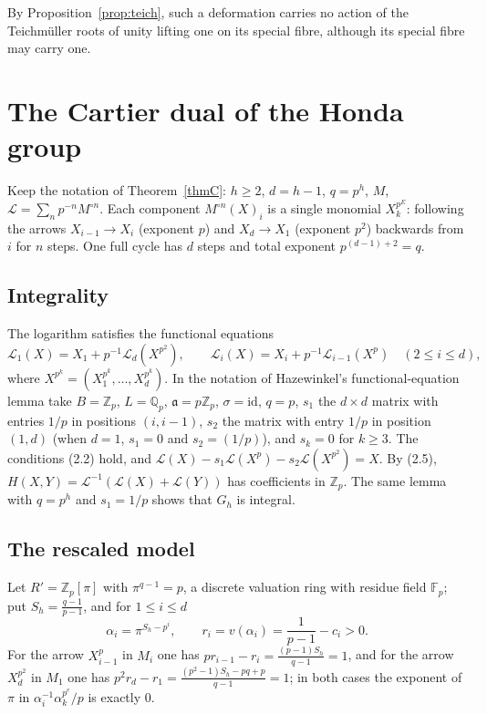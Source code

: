 \documentclass[11pt]{amsart}
\theoremstyle{definition}
\theoremstyle{remark}
\newcommand{\Z}{\mathbb Z}
\newcommand{\Q}{\mathbb Q}
\newcommand{\F}{\mathbb F}
\begin{document}
By Proposition~\ref{prop:teich}, such a deformation carries no action of the Teichm\"uller roots of unity lifting one on its special fibre, although its special fibre may carry one.

\section{The Cartier dual of the Honda group}\label{sec:dual}

Keep the notation of Theorem~\ref{thmC}: $h\ge2$, $d=h-1$, $q=p^h$, $M$, $\mathcal L=\sum_np^{-n}M^{\circ n}$. Each component $M^{\circ n}(X)_i$ is a single monomial $X_k^{p^E}$: following the arrows $X_{i-1}\to X_i$ (exponent $p$) and $X_d\to X_1$ (exponent $p^2$) backwards from $i$ for $n$ steps. One full cycle has $d$ steps and total exponent $p^{(d-1)+2}=q$.

\subsection{Integrality}
The logarithm satisfies the functional equations
\[
 \mathcal L_1(X)=X_1+p^{-1}\mathcal L_d(X^{p^2}),\qquad \mathcal L_i(X)=X_i+p^{-1}\mathcal L_{i-1}(X^p)\quad(2\le i\le d),
\]
where $X^{p^k}=(X_1^{p^k},\dots,X_d^{p^k})$. In the notation of Hazewinkel's functional-equation lemma \cite[2.1--2.3, pp.~73--74]{Hazewinkel79} take $B=\Z_p$, $L=\Q_p$, $\mathfrak a=p\Z_p$, $\sigma=\mathrm{id}$, $q=p$, $s_1$ the $d\times d$ matrix with entries $1/p$ in positions $(i,i-1)$, $s_2$ the matrix with entry $1/p$ in position $(1,d)$ (when $d=1$, $s_1=0$ and $s_2=(1/p)$), and $s_k=0$ for $k\ge3$. The conditions (2.2) hold, and $\mathcal L(X)-s_1\mathcal L(X^p)-s_2\mathcal L(X^{p^2})=X$. By (2.5), $H(X,Y)=\mathcal L^{-1}(\mathcal L(X)+\mathcal L(Y))$ has coefficients in $\Z_p$. The same lemma with $q=p^h$ and $s_1=1/p$ shows that $G_h$ is integral.

\subsection{The rescaled model}
Let $R'=\Z_p[\pi]$ with $\pi^{q-1}=p$, a discrete valuation ring with residue field $\F_p$; put $S_h=\frac{q-1}{p-1}$, and for $1\le i\le d$
\[
 \alpha_i=\pi^{S_h-p^i},\qquad r_i=v(\alpha_i)=\frac1{p-1}-c_i>0 .
\]
For the arrow $X_{i-1}^p$ in $M_i$ one has $pr_{i-1}-r_i=\frac{(p-1)S_h}{q-1}=1$, and for the arrow $X_d^{p^2}$ in $M_1$ one has $p^2r_d-r_1=\frac{(p^2-1)S_h-pq+p}{q-1}=1$; in both cases the exponent of $\pi$ in $\alpha_i^{-1}\alpha_k^{p^e}/p$ is exactly $0$.
\end{document}
